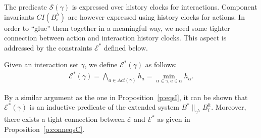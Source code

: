 \documentclass{LMCS}
\newcommand{\eqs}{\mathcal{E}}
\newcommand{\eqsc}{\mathcal{E}^*}
\newcommand{\cn}{\mathit{B}\xspace}
\newcommand{\ic}{\mathit{CI}}
\newcommand{\sep}{\mathcal{S}}
\newcommand{\compgamma}{B^*}
\newcommand{\sysgammah}{\compgamma \|_{\gamma^h} B_i^h}
\theoremstyle{plain}\newtheorem{remark}[thm]{Remark}
\theoremstyle{plain}\newtheorem{example}[thm]{Example}
\begin{document}
The predicate $\sep(\gamma)$ is expressed over history clocks for
interactions.  Component invariants $\ic(\cn_i^h)$ are however
expressed using history clocks for actions.  In order to ``glue'' them
together in a meaningful way, we need some tighter connection between
action and interaction history clocks. This aspect is addressed by the
constraints $\eqsc$ defined below.
\begin{defi}[$\eqsc$]
\label{def:eqsC}
Given an interaction set $\gamma$, we define $\eqsc(\gamma)$ as follows:
\begin{align*}
\eqsc(\gamma) = \displaystyle{\bigwedge_{a \in Act(\gamma)}} h_a = \min\limits_{{\alpha \in \gamma, a \in \alpha}} h_\alpha.
\end{align*}
\end{defi}

By a similar argument as the one in Proposition~\ref{p:eqsI}, it can be
shown that $\eqsc(\gamma)$ is an inductive predicate of the extended system
$\sysgammah$.  Moreover, there exists a tight connection between $\eqs$ and
$\eqsc$ as given in Proposition~\ref{p:conneqsC}.
\end{document}
